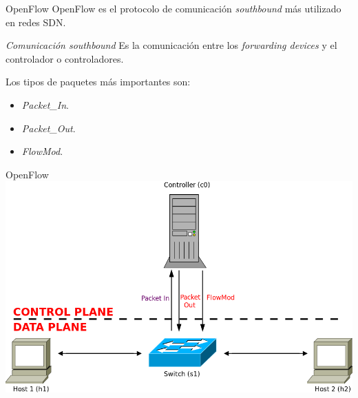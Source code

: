\documentclass{beamer}
\begin{document}
\begin{frame}{OpenFlow}
   OpenFlow es el protocolo de comunicación \textit{southbound} más utilizado en redes SDN. \vspace{10pt}
   \begin{block}{\textit{Comunicación southbound}}
        Es la comunicación entre los \textit{forwarding devices} y el controlador o controladores.
   \end{block}\vspace{10pt}

    Los tipos de paquetes más importantes son:
    \begin{itemize}
        \item \textit{Packet\_In}.
        \item \textit{Packet\_Out}.
        \item \textit{FlowMod}.
    \end{itemize}
\end{frame}

\begin{frame}{OpenFlow}
    \centering
    \includegraphics[scale=0.33]{SDN_flowmod.png}
\end{frame}
\end{document}
